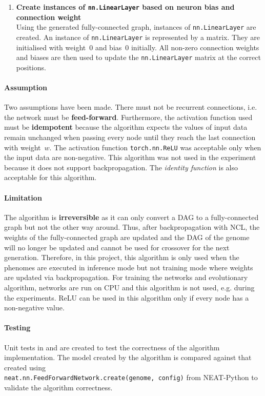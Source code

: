 \begin{enumerate}
    \item \textbf{Create instances of \texttt{nn.LinearLayer} based on neuron bias and connection weight} \\
    Using the generated fully-connected graph, instances of \texttt{nn.LinearLayer} are created. An instance of \texttt{nn.LinearLayer} is represented by a matrix. They are initialised with weight~$0$ and bias~$0$ initially. All non-zero connection weights and biases are then used to update the \texttt{nn.LinearLayer} matrix at the correct positions. 
\end{enumerate}

\paragraph{Assumption}
Two assumptions have been made. There must not be recurrent connections, i.e. the network must be \textbf{feed-forward}. Furthermore, the activation function used must be \textbf{idempotent} because the algorithm expects the values of input data remain unchanged when passing every node until they reach the last connection with weight~$w$. The activation function \texttt{torch.nn.ReLU} was acceptable only when the input data are non-negative. This algorithm was not used in the experiment because it does not support backpropagation. The \textit{identity function} is also acceptable for this algorithm. 

\paragraph{Limitation}
The algorithm is \textbf{irreversible} as it can only convert a DAG to a fully-connected graph but not the other way around. Thus, after backpropagation with NCL, the weights of the fully-connected graph are updated and the DAG of the genome will no longer be updated and cannot be used for crossover for the next generation. Therefore, in this project, this algorithm is only used when the phenomes are executed in inference mode but not training mode where weights are updated via backpropagation. For training the networks and evolutionary algorithm, networks are run on CPU and this algorithm is not used, e.g. during the experiments. 
ReLU can be used in this algorithm only if every node has a non-negative value. 

\paragraph{Testing}
Unit tests in  and  are created to test the correctness of the algorithm implementation. The model created by the algorithm is compared against that created using 
\\
\texttt{neat.nn.FeedForwardNetwork.create(genome, config)} from NEAT-Python to validate the algorithm correctness. 

